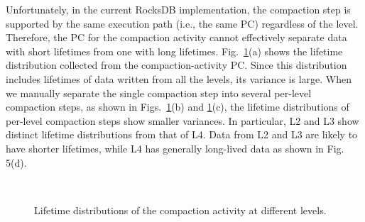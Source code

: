 Unfortunately, in the current RocksDB implementation, the compaction step is supported 
by the same execution path (i.e., the same PC) regardless of the level.
Therefore, the PC for the compaction activity cannot effectively separate data with 
short lifetimes from one with long lifetimes.
Fig.~\ref{fig:compaction_}(a) shows 
the lifetime distribution collected from the compaction-activity PC.  
Since this distribution includes lifetimes of data written from all the levels, 
its variance is large.  
When we manually separate the single compaction step into several per-level compaction steps, 
as shown in Figs.~\ref{fig:compaction_}(b) and \ref{fig:compaction_}(c), the lifetime distributions of per-level compaction steps 
show smaller variances.   
In particular, L2 and L3 show distinct lifetime distributions from that of L4.
Data from L2 and L3 are likely to have shorter lifetimes, while L4 has generally
long-lived data as shown in Fig. 5(d).

\begin{figure}[!t]
\centering
{}
	\hspace{10pt}
\\
	\hspace{10pt}
\caption{Lifetime distributions of the compaction activity at different levels.} %
\label{fig:compaction_}
\end{figure}


